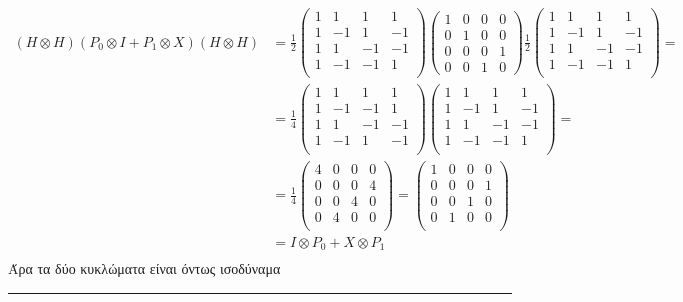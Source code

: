\documentclass[12pt]{article}
\begin{document}
\begin{align*}
    (H\otimes H)(P_0\otimes I + P_1\otimes X)(H\otimes H) &=  \frac{1}{2}\begin{pmatrix*}
        1 &1 & 1& 1\\
        1 &-1 & 1&-1 \\
        1 &1 & -1& -1\\
        1 &-1 & -1&1 \\
    \end{pmatrix*}  \begin{pmatrix*}
        1 &0& 0& 0\\
        0 &1 &0& 0 \\ 
        0 &0& 0 &1 \\ 
        0 &0 &1 &0
    \end{pmatrix*}\frac{1}{2}\begin{pmatrix*}
        1 &1 & 1& 1\\
        1 &-1 & 1&-1 \\
        1 &1 & -1& -1\\
        1 &-1 & -1&1 \\
    \end{pmatrix*} = \\
    & = \frac{1}{4} \begin{pmatrix*}
    1 &1 & 1& 1\\
    1 &-1 & -1&1 \\
    1 &1 & -1& -1\\
    1 &-1 & 1&-1 \\
\end{pmatrix*}\begin{pmatrix*}
1 &1 & 1& 1\\
1 &-1 & 1&-1 \\
1 &1 & -1& -1\\
1 &-1 & -1&1 \\
\end{pmatrix*} = \\ 
&=\frac{1}{4}\begin{pmatrix*}
    4 &0 & 0& 0\\
    0 &0 & 0&4 \\
    0 &0 & 4& 0\\
    0 &4 & 0&0 \\
\end{pmatrix*} =\begin{pmatrix*}
    1 &0 & 0& 0\\
    0 &0 & 0&1 \\
    0 &0 & 1& 0\\
    0 &1 & 0&0 \\
\end{pmatrix*}\\
&= I\otimes P_0  + X\otimes P_1 \\
\end{align*}
 Άρα τα δύο κυκλώματα είναι όντως ισοδύναμα\\
 \rule{\textwidth}{.5pt}
 
\end{document}
